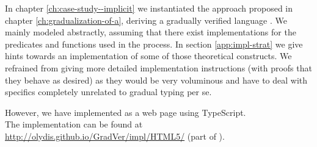 In chapter \ref{ch:case-study--implicit} we instantiated the approach proposed in chapter \ref{ch:gradualization-of-a}, deriving a gradually verified language \gvlidf.
We mainly modeled \gvlidf abstractly, assuming that there exist implementations for the predicates and functions used in the process.
In section \ref{app:impl-strat} we give hints towards an implementation of some of those theoretical constructs.
We refrained from giving more detailed implementation instructions (with proofs that they behave as desired) as they would be very voluminous and have to deal with specifics completely unrelated to gradual typing per se.

However, we have implemented \gvlidf as a web page using TypeScript.\\
The implementation can be found at \url{http://olydis.github.io/GradVer/impl/HTML5/} (part of \cite{olydisGitHub}).
